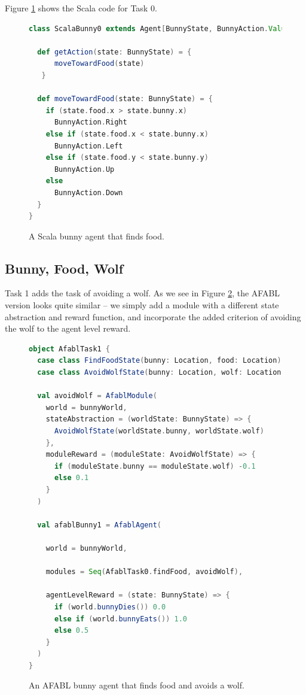 Figure  \ref{fig:scala0} shows the Scala code for Task 0.

\begin{figure}[h]
\begin{lstlisting}[language=Scala]
class ScalaBunny0 extends Agent[BunnyState, BunnyAction.Value] {

  def getAction(state: BunnyState) = {
      moveTowardFood(state)
   }

  def moveTowardFood(state: BunnyState) = {
    if (state.food.x > state.bunny.x)
      BunnyAction.Right
    else if (state.food.x < state.bunny.x)
      BunnyAction.Left
    else if (state.food.y < state.bunny.y)
      BunnyAction.Up
    else
      BunnyAction.Down
  }
}
\end{lstlisting}
\caption{A Scala bunny agent that finds food.}
\label{fig:scala0}
\end{figure}


\subsection{Bunny, Food, Wolf}

Task 1 adds the task of avoiding a wolf. As we see in Figure \ref{fig:afabl1}, the AFABL version looks quite similar -- we simply add a module with a different state abstraction and reward function, and incorporate the added criterion of avoiding the wolf to the agent level reward.

\begin{figure}[h]
\begin{lstlisting}[language=Scala]
object AfablTask1 {
  case class FindFoodState(bunny: Location, food: Location)
  case class AvoidWolfState(bunny: Location, wolf: Location)

  val avoidWolf = AfablModule(
    world = bunnyWorld,
    stateAbstraction = (worldState: BunnyState) => {
      AvoidWolfState(worldState.bunny, worldState.wolf)
    },
    moduleReward = (moduleState: AvoidWolfState) => {
      if (moduleState.bunny == moduleState.wolf) -0.1
      else 0.1
    }
  )

  val afablBunny1 = AfablAgent(

    world = bunnyWorld,

    modules = Seq(AfablTask0.findFood, avoidWolf),

    agentLevelReward = (state: BunnyState) => {
      if (world.bunnyDies()) 0.0
      else if (world.bunnyEats()) 1.0
      else 0.5
    }
  )
}
\end{lstlisting}
\caption{An AFABL bunny agent that finds food and avoids a wolf.}
\label{fig:afabl1}
\end{figure}

